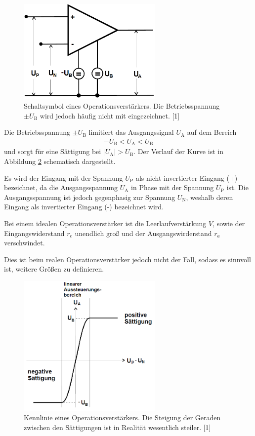 \documentclass[]{scrartcl}
\begin{document}
\begin{figure}[H]
\centering
\includegraphics[width=7cm]{images/schaltsymbol_operationsverstaerker.png}
\caption{Schaltsymbol eines Operationsverstärkers. Die Betriebsspannung $\pm U_{\text{B}}$ wird jedoch häufig nicht mit eingezeichnet. [1]}
\label{fig:schaltsymbol_operationsverstaerker}
\end{figure}

Die Betriebsspannung $\pm U_{\text{B}}$ limitiert das Ausgangssignal $U_{\text{A}}$ auf dem Bereich
\begin{align}
 -U_{\text{B}} < U_{\text{A}} < U_{\text{B}}
\end{align}
und sorgt für eine Sättigung bei $\left| U_{\text{A}} \right| > U_{\text{B}}$. Der Verlauf der Kurve ist in Abbildung \ref{fig:kennlinie_operationsverstaerker} schematisch dargestellt. 

Es wird der Eingang mit der Spannung $U_{\text{P}}$ als nicht-invertierter Eingang (+) bezeichnet, da die Ausgangs\-spannung $U_{\text{A}}$ in Phase mit der Spannung $U_{\text{P}}$ ist.
Die Ausgangsspannung ist jedoch gegenphasig zur Spannung $U_{\text{N}}$, weshalb deren Eingang als invertierter Eingang (-) bezeichnet wird.

Bei einem idealen Operationsverstärker ist die Leerlaufverstärkung $V$, sowie der Eingangswiderstand $r_{e}$ unendlich groß und der Ausgangswirderstand $r_a$ verschwindet.

Dies ist beim realen Operationsverstärker jedoch nicht der Fall, sodass es sinnvoll ist, weitere Größen zu definieren.

\begin{figure}[H]
\centering
\includegraphics[width=7cm]{images/kennlinie_operationsverstaerker.png}
\caption{Kennlinie eines Operationsverstärkers. Die Steigung der Geraden zwischen den Sättigungen ist in Realität wesentlich steiler. [1]}
\label{fig:kennlinie_operationsverstaerker}
\end{figure}
\end{document}
